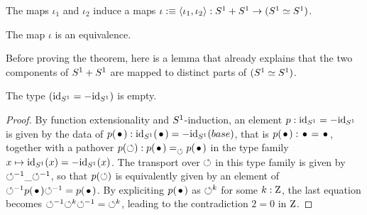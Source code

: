 \documentclass[english,a4]{article}
\def\blank{\_}%
\begin{document}
The maps $\iota_1$ and $\iota_2$ induce a maps
$\iota \mathrel{\hbox{:}\mkern-5mu\equiv} \langle\iota_1,\iota_2\rangle : {S^1} + {S^1} \to ({S^1}\simeq
{S^1})$.
\begin{theorem*}
  The map $\iota$ is an equivalence.
\end{theorem*}
%
Before proving the theorem, here is a lemma that already explains that
the two components of ${S^1}+{S^1}$ are mapped to distinct parts of
$({S^1} \simeq {S^1})$.
\begin{lemma}
  \label{lemma:id-not-equal-oppid}%
  The type $(\mathord{\mathrm{id}}_{S^1} = -\mathord{\mathrm{id}}_{S^1})$ is empty.
\end{lemma}
\begin{proof}
  By function extensionality and ${S^1}$-induction, an element
  $p : \mathord{\mathrm{id}}_{S^1} = -\mathord{\mathrm{id}}_{S^1}$ is given by the data of
  $p(\base) : \id_\Sc(\base) = -\id_\Sc(base)$, that is
  $p(\base):\base=\base$, together with a pathover
  $p(\Sloop): \pathover {p(\base)} {} \Sloop {p(\base)}$ in the type
  family $x\mapsto \mathord{\mathrm{id}}_{S^1} (x)=-\mathord{\mathrm{id}}_{S^1} (x)$. The transport over
  $\mathord{\circlearrowleft}$ in this type family is given by
  $\inv\Sloop\blank\inv\Sloop$, so that $p(\mathord{\circlearrowleft})$ is equivalently
  given by an element of $\inv\Sloop p(\base) \inv\Sloop =
  p(\base)$. By expliciting $p(\base)$ as $\mathord{\circlearrowleft}^k$ for some
  $k:\mathrm{Z}$, the last equation becomes
  ${\mathord{\circlearrowleft}}^{-1} \mathord{\circlearrowleft}^k {\mathord{\circlearrowleft}}^{-1} = \mathord{\circlearrowleft}^k$, leading to the
  contradiction $2=0$ in $\mathrm{Z}$.
\end{proof}
\end{document}
